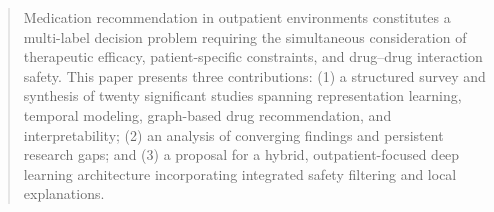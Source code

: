 \begin{abstract}
Medication recommendation in outpatient environments constitutes a multi-label decision problem requiring the simultaneous consideration of therapeutic efficacy, patient-specific constraints, and drug--drug interaction safety. This paper presents three contributions: (1) a structured survey and synthesis of twenty significant studies spanning representation learning, temporal modeling, graph-based drug recommendation, and interpretability; (2) an analysis of converging findings and persistent research gaps; and (3) a proposal for a hybrid, outpatient-focused deep learning architecture incorporating integrated safety filtering and local explanations.
\end{abstract}


